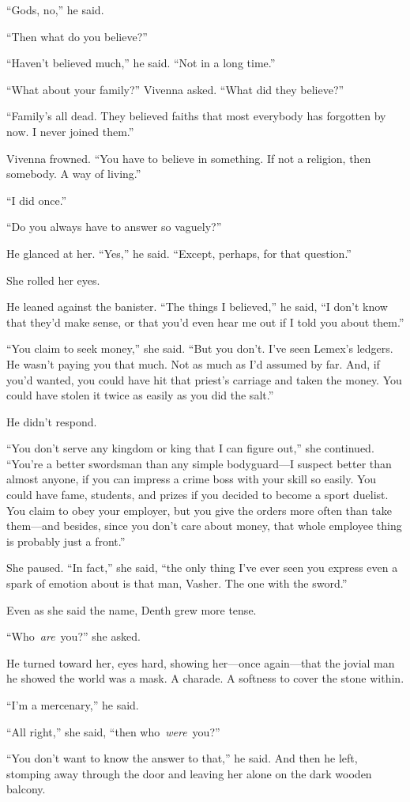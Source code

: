“Gods, no,” he said.

“Then what do you believe?”

“Haven’t believed much,” he said. “Not in a long time.”

“What about your family?” Vivenna asked. “What did they believe?”

“Family’s all dead. They believed faiths that most everybody has forgotten by now. I never joined them.”

Vivenna frowned. “You have to believe in something. If not a religion, then somebody. A way of living.”

“I did once.”

“Do you always have to answer so vaguely?”

He glanced at her. “Yes,” he said. “Except, perhaps, for that question.”

She rolled her eyes.

He leaned against the banister. “The things I believed,” he said, “I don’t know that they’d make sense, or that you’d even hear me out if I told you about them.”

“You claim to seek money,” she said. “But you don’t. I’ve seen Lemex’s ledgers. He wasn’t paying you that much. Not as much as I’d assumed by far. And, if you’d wanted, you could have hit that priest’s carriage and taken the money. You could have stolen it twice as easily as you did the salt.”

He didn’t respond.

“You don’t serve any kingdom or king that I can figure out,” she continued. “You’re a better swordsman than any simple bodyguard—I suspect better than almost anyone, if you can impress a crime boss with your skill so easily. You could have fame, students, and prizes if you decided to become a sport duelist. You claim to obey your employer, but you give the orders more often than take them—and besides, since you don’t care about money, that whole employee thing is probably just a front.”

She paused. “In fact,” she said, “the only thing I’ve ever seen you express even a spark of emotion about is that man, Vasher. The one with the sword.”

Even as she said the name, Denth grew more tense.

“Who~\textit{are}~you?” she asked.

He turned toward her, eyes hard, showing her—once again—that the jovial man he showed the world was a mask. A charade. A softness to cover the stone within.

“I’m a mercenary,” he said.

“All right,” she said, “then who~\textit{were}~you?”

“You don’t want to know the answer to that,” he said. And then he left, stomping away through the door and leaving her alone on the dark wooden balcony.

